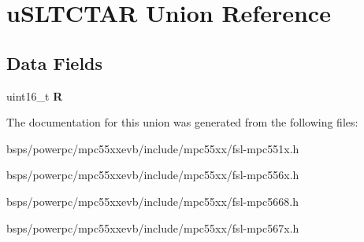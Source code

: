 \hypertarget{unionuSLTCTAR}{}\section{u\+S\+L\+T\+C\+T\+AR Union Reference}
\label{unionuSLTCTAR}
\subsection*{Data Fields}
\begin{DoxyCompactItemize}
\item 
\mbox{\label{unionuSLTCTAR_a0e3e3a96f08be8bf61b67ec4198fb05a}} 
uint16\+\_\+t {\bfseries R}
\end{DoxyCompactItemize}


The documentation for this union was generated from the following files\+:\begin{DoxyCompactItemize}
\item 
bsps/powerpc/mpc55xxevb/include/mpc55xx/fsl-\/mpc551x.\+h\item 
bsps/powerpc/mpc55xxevb/include/mpc55xx/fsl-\/mpc556x.\+h\item 
bsps/powerpc/mpc55xxevb/include/mpc55xx/fsl-\/mpc5668.\+h\item 
bsps/powerpc/mpc55xxevb/include/mpc55xx/fsl-\/mpc567x.\+h\end{DoxyCompactItemize}
